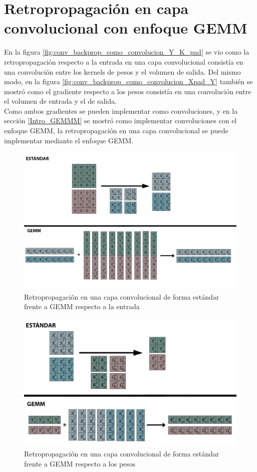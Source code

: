 \section{Retropropagación en capa convolucional con enfoque GEMM}

En la figura \ref{fig:conv_backprop_como_convolucion_Y_K_pad} se vio como la retropropagación respecto a la entrada en una capa convolucional consistía en una convolución entre los kernels de pesos y el volumen de salida. Del mismo modo, en la figura \ref{fig:conv_backprop_como_convolucion_Xpad_Y} también se mostró como el gradiente respecto a los pesos consistía en una convolución entre el volumen de entrada y el de salida. \\
Como ambos gradientes se pueden implementar como convoluciones, y en la sección \ref{Intro_GEMMM} se mostró como implementar convoluciones con el enfoque GEMM, la retropropagación en una capa convolucional se puede implementar mediante el enfoque GEMM.

\begin{figure}[H]
	\hspace{-25mm}
	\includegraphics[scale=0.3]{imagenes/conv_std_vs_gemm_backprop.jpg}  
	\caption{Retropropagación en una capa convolucional de forma estándar frente a GEMM respecto a la entrada}
	\label{fig:conv_std_vs_gemm_backprop}
\end{figure}

\begin{figure}[H]
	\hspace{-25mm}
	\includegraphics[scale=0.3]{imagenes/conv_std_vs_gemm_backprop_pesos.jpg}  
	\caption{Retropropagación en una capa convolucional de forma estándar frente a GEMM respecto a los pesos}
	\label{fig:conv_std_vs_gemm_backprop_pesos}
\end{figure}
